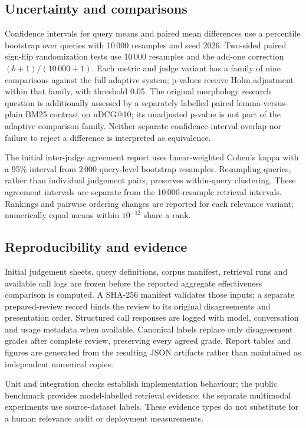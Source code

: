 \subsection{Uncertainty and comparisons}
Confidence intervals for query means and paired mean differences use a percentile bootstrap over queries with 10\,000 resamples and seed 2026. Two-sided paired sign-flip randomization tests use 10\,000 resamples and the add-one correction $(b+1)/(10\,000+1)$. Each metric and judge variant has a family of nine comparisons against the full adaptive system; p-values receive Holm adjustment within that family, with threshold 0.05. The original morphology research question is additionally assessed by a separately labelled paired lemma-versus-plain BM25 contrast on nDCG@10; its unadjusted p-value is not part of the adaptive comparison family. Neither separate confidence-interval overlap nor failure to reject a difference is interpreted as equivalence.

The initial inter-judge agreement report uses linear-weighted Cohen's kappa with a 95\% interval from 2\,000 query-level bootstrap resamples. Resampling queries, rather than individual judgement pairs, preserves within-query clustering. These agreement intervals are separate from the 10\,000-resample retrieval intervals. Rankings and pairwise ordering changes are reported for each relevance variant; numerically equal means within $10^{-12}$ share a rank.

\subsection{Reproducibility and evidence}
Initial judgement sheets, query definitions, corpus manifest, retrieval runs and available call logs are frozen before the reported aggregate effectiveness comparison is computed. A SHA-256 manifest validates those inputs; a separate prepared-review record binds the review to its original disagreements and presentation order. Structured call responses are logged with model, conversation and usage metadata when available. Canonical labels replace only disagreement grades after complete review, preserving every agreed grade. Report tables and figures are generated from the resulting JSON artifacts rather than maintained as independent numerical copies.

Unit and integration checks establish implementation behaviour; the public benchmark provides model-labelled retrieval evidence; the separate multimodal experiments use source-dataset labels. These evidence types do not substitute for a human relevance audit or deployment measurements.

